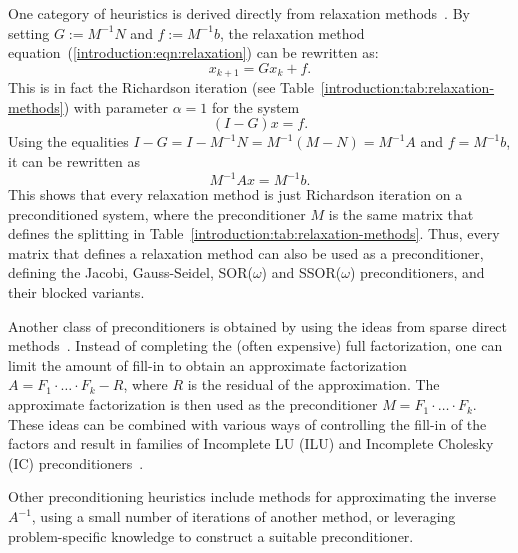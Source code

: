 One category of heuristics is derived directly from relaxation
methods~\cite{saad}. By setting $G := M^{-1}N$ and $f := M^{-1}b$, the
relaxation method equation~(\ref{introduction:eqn:relaxation}) can be rewritten
as:
\begin{equation}
    x_{k+1} = Gx_{k} + f.
\end{equation}
This is in fact the Richardson iteration (see
Table~\ref{introduction:tab:relaxation-methods}) with parameter $\alpha = 1$ for
the system
\begin{equation}
    (I - G)x = f.
\end{equation}
Using the equalities $I - G = I - M^{-1}N = M^{-1}(M - N) = M^{-1}A$ and $f =
M^{-1}b$, it can be rewritten as
\begin{equation}
    M^{-1}Ax = M^{-1}b.
\end{equation}
This shows that every relaxation method is just Richardson iteration on a
preconditioned system, where the preconditioner $M$ is the same matrix that
defines the splitting in Table~\ref{introduction:tab:relaxation-methods}. Thus,
every matrix that defines a relaxation method can also be used as a
preconditioner, defining the Jacobi, Gauss-Seidel, SOR($\omega$) and
SSOR($\omega$) preconditioners, and their blocked variants.

Another class of preconditioners is obtained by using the ideas from sparse
direct methods~\cite{saad}. Instead of completing the (often expensive) full
factorization, one can limit the amount of fill-in to obtain an approximate
factorization $A = F_1 \cdot \ldots \cdot F_k - R$, where $R$ is the residual of
the approximation. The approximate factorization is then used as the
preconditioner $M = F_1 \cdot \ldots \cdot F_k$. These ideas can be combined
with various ways of controlling the fill-in of the factors and result in
families of Incomplete LU (ILU) and Incomplete Cholesky (IC)
preconditioners~\cite{saad, parilut}.

Other preconditioning heuristics include methods for approximating the inverse
$A^{-1}$, using a small number of iterations of another method, or leveraging
problem-specific knowledge to construct a suitable preconditioner.
